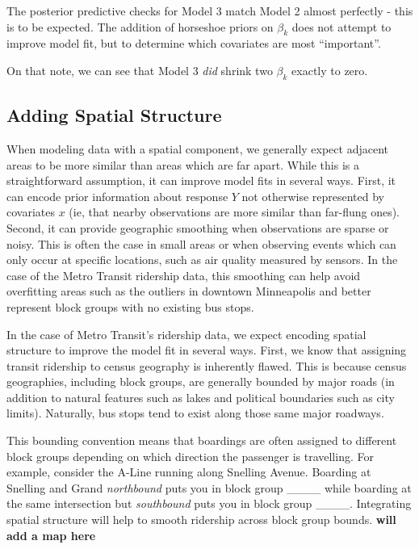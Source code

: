 \documentclass[
]{article}
\begin{document}
The posterior predictive checks for Model 3 match Model 2 almost
perfectly - this is to be expected. The addition of horseshoe priors on
\(\beta_k\) does not attempt to improve model fit, but to determine
which covariates are most ``important''.

On that note, we can see that Model 3 \emph{did} shrink two \(\beta_k\)
exactly to zero.

\hypertarget{adding-spatial-structure}{%
\subsection{Adding Spatial Structure}\label{adding-spatial-structure}}

When modeling data with a spatial component, we generally expect
adjacent areas to be more similar than areas which are far apart. While
this is a straightforward assumption, it can improve model fits in
several ways. First, it can encode prior information about response
\(Y\) not otherwise represented by covariates \(x\) (ie, that nearby
observations are more similar than far-flung ones). Second, it can
provide geographic smoothing when observations are sparse or noisy. This
is often the case in small areas or when observing events which can only
occur at specific locations, such as air quality measured by sensors. In
the case of the Metro Transit ridership data, this smoothing can help
avoid overfitting areas such as the outliers in downtown Minneapolis and
better represent block groups with no existing bus stops.

In the case of Metro Transit's ridership data, we expect encoding
spatial structure to improve the model fit in several ways. First, we
know that assigning transit ridership to census geography is inherently
flawed. This is because census geographies, including block groups, are
generally bounded by major roads (in addition to natural features such
as lakes and political boundaries such as city limits). Naturally, bus
stops tend to exist along those same major roadways.

This bounding convention means that boardings are often assigned to
different block groups depending on which direction the passenger is
travelling. For example, consider the A-Line running along Snelling
Avenue. Boarding at Snelling and Grand \emph{northbound} puts you in
block group \_\_\_\_ while boarding at the same intersection but
\emph{southbound} puts you in block group \_\_\_\_. Integrating spatial
structure will help to smooth ridership across block group bounds.
\textbf{will add a map here}
\end{document}
